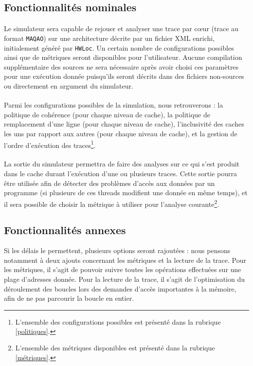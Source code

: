 \subsection{Fonctionnalités nominales}

\paragraph{}
Le simulateur sera capable de rejouer et analyser une trace par c\oe ur (trace au format \texttt{MAQAO}) sur une architecture décrite par un fichier XML enrichi, initialement généré par \texttt{HWLoc}. Un certain nombre de configurations possibles ainsi que de métriques seront disponibles pour l'utilisateur. Aucune compilation supplémentaire des sources ne sera nécessaire après avoir choisi ces paramètres pour une exécution donnée puisqu'ils seront décrits dans des fichiers non-sources ou directement en argument du simulateur. 

\paragraph{}
Parmi les configurations possibles de la simulation, nous retrouverons : la politique de cohérence (pour chaque niveau de cache), la politique de remplacement d'une ligne (pour chaque niveau de cache), l'inclusivité des caches les uns par rapport aux autres (pour chaque niveau de cache), et la gestion de l'ordre d'exécution des traces\footnote{L'ensemble des configurations possibles est présenté dans la rubrique \ref{politiques}.}.

\paragraph{}
La sortie du simulateur permettra de faire des analyses sur ce qui s'est produit dans le cache durant l'exécution d'une ou plusieurs traces. Cette sortie pourra être utilisée afin de détecter des problèmes d'accès aux données par un programme (si plusieurs de ces threads modifient une donnée en même temps), et il sera possible de choisir la métrique à utiliser pour l'analyse courante\footnote{L'ensemble des métriques disponibles est présenté dans la rubrique \ref{métriques}.}. 

\subsection{Fonctionnalités annexes}

Si les délais le permettent, plusieurs options seront rajoutées : nous pensons notamment à deux ajouts concernant les métriques et la lecture de la trace. Pour les métriques, il s'agit de pouvoir suivre toutes les opérations effectuées sur une plage d'adresses donnée. Pour la lecture de la trace, il s'agit de l'optimisation du déroulement des boucles lors des demandes d'accès importantes à la mémoire, afin de ne pas parcourir la boucle en entier.


